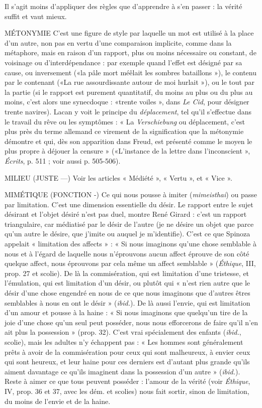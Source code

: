 Il s’agit moins d’appliquer des règles que d’apprendre à s’en passer : la
vérité suffit et vaut mieux.

MÉTONYMIE C’est une figure de style par laquelle un mot est utilisé à la
place d’un autre, non pas en vertu d’une comparaison implicite,
comme dans la métaphore, mais en raison d’un rapport, plus ou moins
nécessaire ou constant, de voisinage ou d’interdépendance : par exemple quand
l'effet est désigné par sa cause, ou inversement («la pâle mort méêlait les
sombres bataillons »), le contenu par le contenant («La rue assourdissante
autour de moi hurlait »), ou le tout par la partie (si le rapport est purement
quantitatif, du moins au plus ou du plus au moins, c’est alors une synecdoque :
«trente voiles », dans {\it Le Cid}, pour désigner trente navires). Lacan y voit le
principe du {\it déplacement}, tel qu’il s'effectue dans le travail du rêve ou les
symptômes : « La {\it Verschiebung} ou déplacement, c’est plus près du terme allemand
ce virement de la signification que la métonymie démontre et qui, dès
son apparition dans Freud, est présenté comme le moyen le plus propre à
déjouer la censure » («L’instance de la lettre dans l'inconscient », {\it Écrits},
p. 511 ; voir aussi p. 505-506).

MILIEU (JUSTE —) Voir les articles « Médiété », « Vertu », et « Vice ».

MIMÉTIQUE (FONCTION -) Ce qui nous pousse à imiter ({\it mimeisthai})
ou passe par limitation. C’est une dimension
essentielle du désir. Le rapport entre le sujet désirant et l’objet désiré n’est
pas duel, montre René Girard : c’est un rapport triangulaire, car médiatisé par
le désir de l’autre (je ne désire un objet que parce qu’un autre le désire, que
j'imite ou auquel je m'identifie). C’est ce que Spinoza appelait « limitation des
affects » : « Si nous imaginons qu’une chose semblable à nous et à l'égard de
laquelle nous n’éprouvons aucun affect éprouve de son côté quelque affect,
nous éprouvons par cela même un affect semblable » ({\it Éthique}, III, prop. 27 et
scolie). De là la commisération, qui est limitation d’une tristesse, et l’émulation,
qui est limitation d’un désir, ou plutôt qui « n’est rien autre que le désir
d’une chose engendré en nous de ce que nous imaginons que d’autres êtres
semblables à nous en ont le désir » ({\it ibid.}). De là aussi l'envie, qui est limitation
d’un amour et pousse à la haine : « Si nous imaginons que quelqu'un tire de la
joie d’une chose qu’un seul peut posséder, nous nous efforcerons de faire qu’il
n’en ait plus la possession » (prop. 32). C’est vrai spécialement des enfants
({\it ibid.}, scolie), mais les adultes n’y échappent pas : « Les hommes sont généralement
prêts à avoir de la commisération pour ceux qui sont malheureux, à
envier ceux qui sont heureux, et leur haine pour ces derniers est d’autant plus
grande qu’ils aiment davantage ce qu’ils imaginent dans la possession d’un
autre » ({\it ibid.}). Reste à aimer ce que tous peuvent posséder : l'amour de la vérité
(voir {\it Éthique}, IV, prop. 36 et 37, avec les dém. et scolies) nous fait sortir, sinon
de limitation, du moins de l’envie et de la haine.

